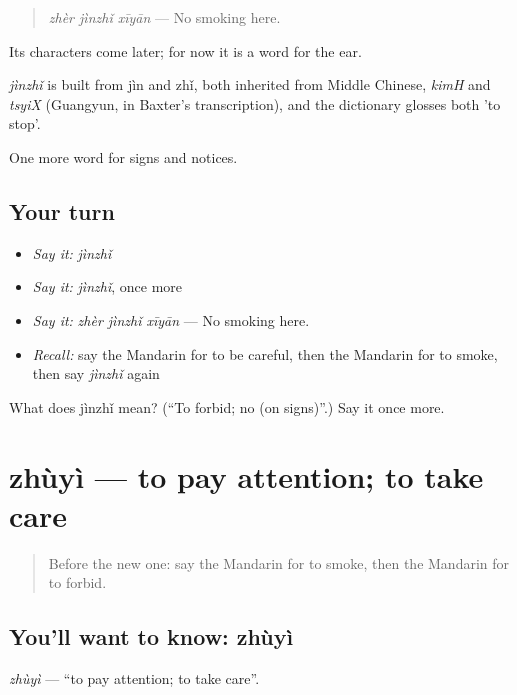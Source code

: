 \begin{quote}
\emph{zhèr jìnzhǐ xīyān} — No smoking here.
\end{quote}

Its characters come later; for now it is a word for the ear.

\begin{cousinweb}
\emph{jìnzhǐ} is built from jìn and zhǐ, both inherited from Middle Chinese, \emph{kimH} and \emph{tsyiX} (Guangyun, in Baxter's transcription), and the dictionary glosses both 'to stop'.
\end{cousinweb}

\begin{grammarlens}[title={What you've built}]
One more word for signs and notices.
\end{grammarlens}

\subsection*{Your turn}
\begin{itemize}
\raggedright
  \item \emph{Say it:} \emph{jìnzhǐ}
  \item \emph{Say it:} \emph{jìnzhǐ}, once more
  \item \emph{Say it:} \emph{zhèr jìnzhǐ xīyān} — No smoking here.
  \item \emph{Recall:} say the Mandarin for to be careful, then the Mandarin for to smoke, then say \emph{jìnzhǐ} again
\end{itemize}

\begin{tcolorbox}[breakable,colback=teal!4,colframe=teal!35!black,title={Before you move on}]
What does jìnzhǐ mean? (\textquotedblleft{}To forbid; no (on signs)\textquotedblright{}.) Say it once more.
\end{tcolorbox}
\section[zhùyì]{zhùyì — to pay attention; to take care}

\label{lesson:ZH-C115-zhuyi}



\begin{quote}
Before the new one: say the Mandarin for to smoke, then the Mandarin for to forbid.
\end{quote}

\subsection*{You'll want to know: zhùyì}
\emph{zhùyì} — \textquotedblleft{}to pay attention; to take care\textquotedblright{}.

